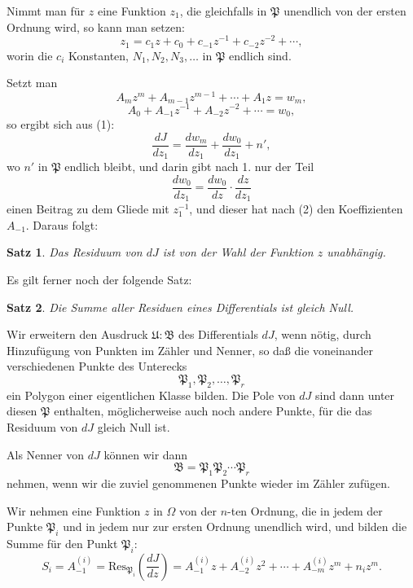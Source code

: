 \documentclass[12pt,a4paper]{article}
\newtheorem*{satz}{Satz}
\begin{document}
Nimmt man für $z$ eine Funktion $z_1$, die gleichfalls in $\mathfrak{P}$ unendlich von der ersten Ordnung wird, so kann man setzen:
\begin{equation}\label{eq:201-2}
z_1 = c_1 z + c_0 + c_{-1} z^{-1} + c_{-2} z^{-2} + \cdots,
\end{equation}
worin die $c_i$ Konstanten, $N_1, N_2, N_3, \ldots$ in $\mathfrak{P}$ endlich sind.

Setzt man
\[
A_m z^m + A_{m-1} z^{m-1} + \cdots + A_1 z = w_m,
\]
\[
A_0 + A_{-1} z^{-1} + A_{-2} z^{-2} + \cdots = w_0,
\]
so ergibt sich aus (1):
\[
\frac{dJ}{dz_1} = \frac{dw_m}{dz_1} + \frac{dw_0}{dz_1} + n',
\]
wo $n'$ in $\mathfrak{P}$ endlich bleibt, und darin gibt nach 1. nur der Teil
\[
\frac{dw_0}{dz_1} = \frac{dw_0}{dz} \cdot \frac{dz}{dz_1}
\]
einen Beitrag zu dem Gliede mit $z_1^{-1}$, und dieser hat nach (2) den Koeffizienten $A_{-1}$. Daraus folgt:

\begin{satz}
Das Residuum von $dJ$ ist von der Wahl der Funktion $z$ unabhängig.
\end{satz}

Es gilt ferner noch der folgende Satz:

\begin{satz}
Die Summe aller Residuen eines Differentials ist gleich Null.
\end{satz}

Wir erweitern den Ausdruck $\mathfrak{U}:\mathfrak{B}$ des Differentials $dJ$, wenn nötig, durch Hinzufügung von Punkten im Zähler und Nenner, so daß die voneinander verschiedenen Punkte des Unterecks
\begin{equation}\label{eq:201-3}
\mathfrak{P}_1, \mathfrak{P}_2, \ldots, \mathfrak{P}_r
\end{equation}
ein Polygon einer eigentlichen Klasse bilden. Die Pole von $dJ$ sind dann unter diesen $\mathfrak{P}$ enthalten, möglicherweise auch noch andere Punkte, für die das Residuum von $dJ$ gleich Null ist.

Als Nenner von $dJ$ können wir dann
\begin{equation}\label{eq:201-4}
\mathfrak{B} = \mathfrak{P}_1 \mathfrak{P}_2 \cdots \mathfrak{P}_r
\end{equation}
nehmen, wenn wir die zuviel genommenen Punkte wieder im Zähler zufügen.

Wir nehmen eine Funktion $z$ in $\Omega$ von der $n$-ten Ordnung, die in jedem der Punkte $\mathfrak{P}_i$ und in jedem nur zur ersten Ordnung unendlich wird, und bilden die Summe für den Punkt $\mathfrak{P}_i$:
\begin{equation}\label{eq:201-5}
S_i = A_{-1}^{(i)} = \text{Res}_{\mathfrak{P}_i}\left(\frac{dJ}{dz}\right) = A_{-1}^{(i)} z + A_{-2}^{(i)} z^2 + \cdots + A_{-m}^{(i)} z^m + n_i z^m.
\end{equation}
\end{document}
